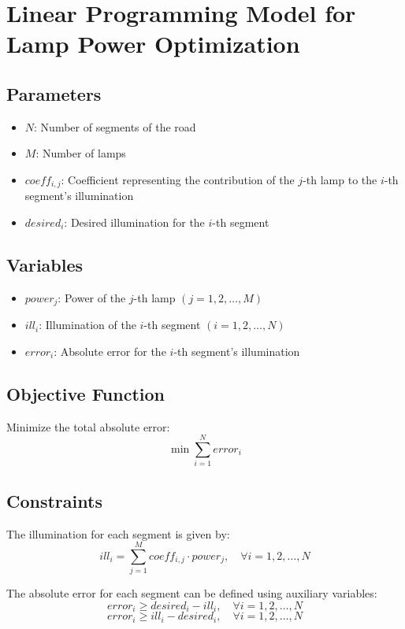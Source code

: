 \documentclass{article}
\begin{document}
\section*{Linear Programming Model for Lamp Power Optimization}

\subsection*{Parameters}
\begin{itemize}
    \item $N$: Number of segments of the road
    \item $M$: Number of lamps
    \item $coeff_{i,j}$: Coefficient representing the contribution of the $j$-th lamp to the $i$-th segment's illumination
    \item $desired_i$: Desired illumination for the $i$-th segment
\end{itemize}

\subsection*{Variables}
\begin{itemize}
    \item $power_j$: Power of the $j$-th lamp $(j = 1, 2, \ldots, M)$
    \item $ill_i$: Illumination of the $i$-th segment $(i = 1, 2, \ldots, N)$
    \item $error_i$: Absolute error for the $i$-th segment's illumination
\end{itemize}

\subsection*{Objective Function}
Minimize the total absolute error:
\[
\min \sum_{i=1}^{N} error_i
\]

\subsection*{Constraints}
The illumination for each segment is given by:
\[
ill_i = \sum_{j=1}^{M} coeff_{i,j} \cdot power_j, \quad \forall i = 1, 2, \ldots, N
\]

The absolute error for each segment can be defined using auxiliary variables:
\[
error_i \geq desired_i - ill_i, \quad \forall i = 1, 2, \ldots, N
\]
\[
error_i \geq ill_i - desired_i, \quad \forall i = 1, 2, \ldots, N
\]
\end{document}
